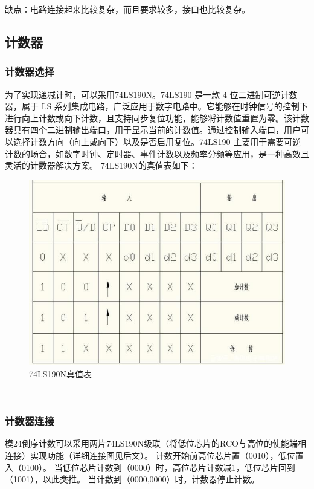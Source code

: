 \documentclass[12p,UTF8]{article}
\begin{document}
\begin{spacing}{1.25}
  缺点：电路连接起来比较复杂，而且要求较多，接口也比较复杂。
  \subsection{计数器}
  \subsubsection{计数器选择}
  为了实现递减计时，可以采用74LS190N。74LS190 是一款 4 位二进制可逆计数器，属于 LS 系列集成电路，广泛应用于数字电路中。它能够在时钟信号的控制下进行向上计数或向下计数，且支持同步复位功能，能够将计数值重置为零。该计数器具有四个二进制输出端口，用于显示当前的计数值。通过控制输入端口，用户可以选择计数方向（向上或向下）以及是否启用复位。74LS190 主要用于需要可逆计数的场合，如数字时钟、定时器、事件计数以及频率分频等应用，是一种高效且灵活的计数器解决方案。
  74LS190N的真值表如下：
  \begin{figure}
       \centering
        \includegraphics[width=\linewidth]{zzb}
        \caption{74LS190N真值表}
        \label{zzb}
      \end{figure}
      \\[1cm]
  \subsubsection{计数器连接}
  
  模24倒序计数可以采用两片74LS190N级联（将低位芯片的RCO与高位的使能端相连接）实现功能（详细连接图见后文）。
  计数开始前高位芯片置（0010），低位置入（0100）。
  当低位芯片计数到（0000）时，高位芯片计数减1，低位芯片回到（1001），以此类推。
  当计数到（0000,0000）时，计数器停止计数。
 

\end{spacing}
\end{document}
